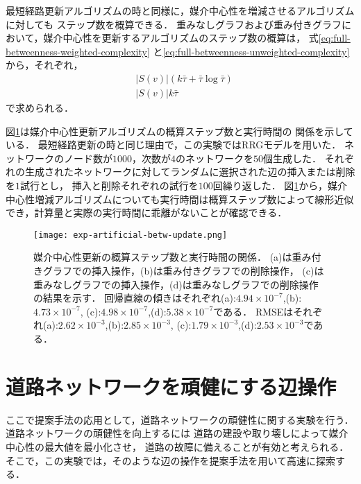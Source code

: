最短経路更新アルゴリズムの時と同様に，媒介中心性を増減させるアルゴリズムに対しても
ステップ数を概算できる．
重みなしグラフおよび重み付きグラフにおいて，媒介中心性を更新するアルゴリズムのステップ数の概算は，
式\eqref{eq:full-betweenness-weighted-complexity}
と\eqref{eq:full-betweenness-unweighted-complexity}から，それぞれ，
\begin{align}
  &|S(v)|(k\bar{\tau}+\bar{\tau}\log\bar{\tau})
  \label{eq:pred-betw-steps-weighted} \\
  &|S(v)|k\bar{\tau}
  \label{eq:pred-betw-steps-unweighted}
\end{align}
で求められる．

図\ref{fig:exp-artificial-betw-update}は媒介中心性更新アルゴリズムの概算ステップ数と実行時間の
関係を示している．
最短経路更新の時と同じ理由で，この実験ではRRGモデルを用いた．
ネットワークのノード数が$1000$，次数が$4$のネットワークを$50$個生成した．
それぞれの生成されたネットワークに対してランダムに選択された辺の挿入または削除を$1$試行とし，
挿入と削除それぞれの試行を$100$回繰り返した．
図\ref{fig:exp-artificial-betw-update}から，媒介中心性増減アルゴリズムについても実行時間は概算ステップ数によって線形近似でき，計算量と実際の実行時間に乖離がないことが確認できる．

\begin{figure}
  \centering
  \texttt{[image: exp-artificial-betw-update.png]}
  \caption{
    媒介中心性更新の概算ステップ数と実行時間の関係．
    (a)は重み付きグラフでの挿入操作，(b)は重み付きグラフでの削除操作，
    (c)は重みなしグラフでの挿入操作，(d)は重みなしグラフでの削除操作の結果を示す．
    回帰直線の傾きはそれぞれ(a):$4.94\times10^{-7}$,(b):$4.73\times10^{-7}$,
    (c):$4.98\times10^{-7}$,(d):$5.38\times10^{-7}$である．
    RMSEはそれぞれ(a):$2.62\times10^{-3}$,(b):$2.85\times10^{-3}$,
    (c):$1.79\times10^{-3}$,(d):$2.53\times10^{-3}$である．
  }
  \label{fig:exp-artificial-betw-update}
\end{figure}

\section{道路ネットワークを頑健にする辺操作}

ここで提案手法の応用として，道路ネットワークの頑健性に関する実験を行う．
道路ネットワークの頑健性を向上するには
道路の建設や取り壊しによって媒介中心性の最大値を最小化させ，
道路の故障に備えることが有効と考えられる．
そこで，この実験では，そのような辺の操作を提案手法を用いて高速に探索する．

